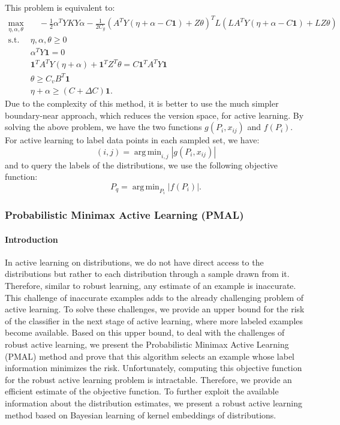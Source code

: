 \documentclass[12pt]{article}
\DeclareMathOperator*{\argmin}{arg\,min}
\begin{document}
	This problem is equivalent to:
	\begin{subequations}
		\begin{align}
			\max_{\eta, \alpha, \theta} &\quad -\frac{1}{2} \alpha^T Y K Y \alpha - \frac{1}{2 C_g} \left( A^T Y (\eta + \alpha - C \mathbf{1}) + Z \theta \right)^T L \left( L A^T Y (\eta + \alpha - C \mathbf{1}) + L Z \theta \right) \\
			\text{s.t. } &\eta, \alpha, \theta \ge 0 \\
			&\alpha^T Y \mathbf{1} = 0 \\
			&\mathbf{1}^T A^T Y (\eta + \alpha) + \mathbf{1}^T Z^T \theta = C \mathbf{1}^T A^T Y \mathbf{1} \\
			&\theta \ge C_v B^T \mathbf{1} \\
			&\eta + \alpha \ge (C + \Delta C) \mathbf{1}.
		\end{align}
	\end{subequations}
	Due to the complexity of this method, it is better to use the much simpler boundary-near approach, which reduces the version space, for active learning. By solving the above problem, we have the two functions $g(P_i, x_{ij})$ and $f(P_i)$. For active learning to label data points in each sampled set, we have:
	\begin{equation}
		(i, j) = \argmin_{i, j} |g(P_i, x_{ij})|
	\end{equation}
	and to query the labels of the distributions, we use the following objective function:
	\begin{equation}
		P_q = \argmin_{P_i} |f(P_i)|.
	\end{equation}
	
	\subsubsection{Probabilistic Minimax Active Learning (PMAL)}
	\label{subsec:pmal}
	
	\paragraph{Introduction}
	In active learning on distributions, we do not have direct access to the distributions but rather to each distribution through a sample drawn from it. Therefore, similar to robust learning, any estimate of an example is inaccurate. This challenge of inaccurate examples adds to the already challenging problem of active learning. To solve these challenges, we provide an upper bound for the risk of the classifier in the next stage of active learning, where more labeled examples become available. Based on this upper bound, to deal with the challenges of robust active learning, we present the Probabilistic Minimax Active Learning (PMAL) method and prove that this algorithm selects an example whose label information minimizes the risk. Unfortunately, computing this objective function for the robust active learning problem is intractable. Therefore, we provide an efficient estimate of the objective function. To further exploit the available information about the distribution estimates, we present a robust active learning method based on Bayesian learning of kernel embeddings of distributions.
	
\end{document}
